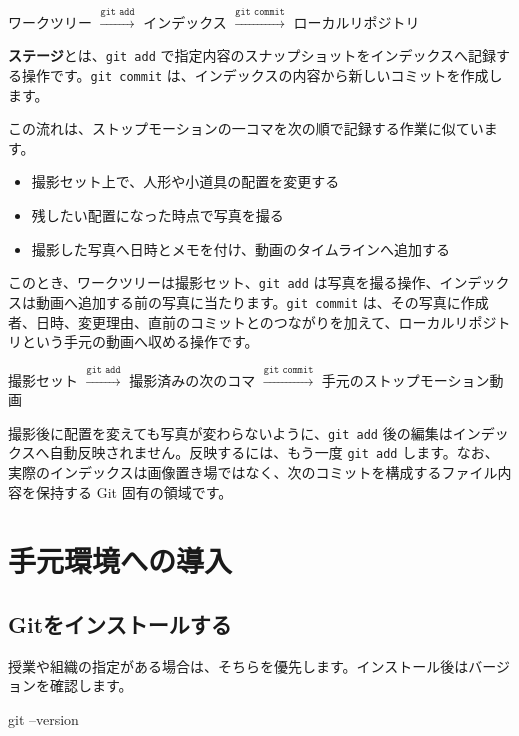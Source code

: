 \documentclass[a4paper,11pt]{jlreq}
\newcommand{\cmd}[1]{\texttt{#1}}
\newcommand{\term}[1]{\textbf{#1}}
\begin{document}
\begin{center}
ワークツリー $\xrightarrow{\texttt{git add}}$ インデックス
$\xrightarrow{\texttt{git commit}}$ ローカルリポジトリ
\end{center}

\term{ステージ}とは、\cmd{git add} で指定内容のスナップショットをインデックスへ記録する操作です。\cmd{git commit} は、インデックスの内容から新しいコミットを作成します。

この流れは、ストップモーションの一コマを次の順で記録する作業に似ています。

\begin{itemize}
  \item 撮影セット上で、人形や小道具の配置を変更する
  \item 残したい配置になった時点で写真を撮る
  \item 撮影した写真へ日時とメモを付け、動画のタイムラインへ追加する
\end{itemize}

このとき、ワークツリーは撮影セット、\cmd{git add} は写真を撮る操作、インデックスは動画へ追加する前の写真に当たります。\cmd{git commit} は、その写真に作成者、日時、変更理由、直前のコミットとのつながりを加えて、ローカルリポジトリという手元の動画へ収める操作です。

\begin{center}
撮影セット $\xrightarrow{\texttt{git add}}$ 撮影済みの次のコマ
$\xrightarrow{\texttt{git commit}}$ 手元のストップモーション動画
\end{center}

撮影後に配置を変えても写真が変わらないように、\cmd{git add} 後の編集はインデックスへ自動反映されません。反映するには、もう一度 \cmd{git add} します。なお、実際のインデックスは画像置き場ではなく、次のコミットを構成するファイル内容を保持する Git 固有の領域です。

\section{手元環境への導入}

\subsection{Gitをインストールする}

授業や組織の指定がある場合は、そちらを優先します。インストール後はバージョンを確認します。

\begin{codeblock}
git --version
\end{codeblock}
\end{document}
